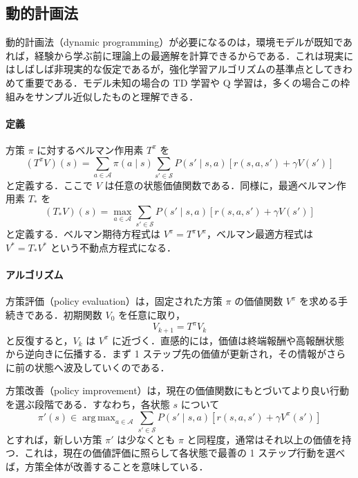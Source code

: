 \subsection{動的計画法}

動的計画法（dynamic programming）が必要になるのは，環境モデルが既知であれば，経験から学ぶ前に理論上の最適解を計算できるからである．これは現実にはしばしば非現実的な仮定であるが，強化学習アルゴリズムの基準点としてきわめて重要である．モデル未知の場合の TD 学習や Q 学習は，多くの場合この枠組みをサンプル近似したものと理解できる．

\paragraph*{定義}
方策 $\pi$ に対するベルマン作用素 $T^\pi$ を
\begin{equation}
(T^\pi V)(s)
=
\sum_{a \in \mathcal{A}} \pi(a \mid s)
\sum_{s' \in \mathcal{S}} P(s' \mid s,a)
\left[
r(s,a,s') + \gamma V(s')
\right]
\end{equation}
と定義する．ここで $V$ は任意の状態価値関数である．同様に，最適ベルマン作用素 $T_\ast$ を
\begin{equation}
(T_\ast V)(s)
=
\max_{a \in \mathcal{A}}
\sum_{s' \in \mathcal{S}} P(s' \mid s,a)
\left[
r(s,a,s') + \gamma V(s')
\right]
\end{equation}
と定義する．ベルマン期待方程式は $V^\pi = T^\pi V^\pi$，ベルマン最適方程式は $V^\ast = T_\ast V^\ast$ という不動点方程式になる．

\paragraph*{アルゴリズム}
方策評価（policy evaluation）は，固定された方策 $\pi$ の価値関数 $V^\pi$ を求める手続きである．初期関数 $V_0$ を任意に取り，
\begin{equation}
V_{k+1} = T^\pi V_k
\end{equation}
と反復すると，$V_k$ は $V^\pi$ に近づく．直感的には，価値は終端報酬や高報酬状態から逆向きに伝播する．まず 1 ステップ先の価値が更新され，その情報がさらに前の状態へ波及していくのである．

方策改善（policy improvement）は，現在の価値関数にもとづいてより良い行動を選ぶ段階である．すなわち，各状態 $s$ について
\begin{equation}
\pi'(s)
\in
\mathop{\mathrm{arg\,max}}_{a \in \mathcal{A}}
\sum_{s' \in \mathcal{S}} P(s' \mid s,a)
\left[
r(s,a,s') + \gamma V^\pi(s')
\right]
\end{equation}
とすれば，新しい方策 $\pi'$ は少なくとも $\pi$ と同程度，通常はそれ以上の価値を持つ．これは，現在の価値評価に照らして各状態で最善の 1 ステップ行動を選べば，方策全体が改善することを意味している．

